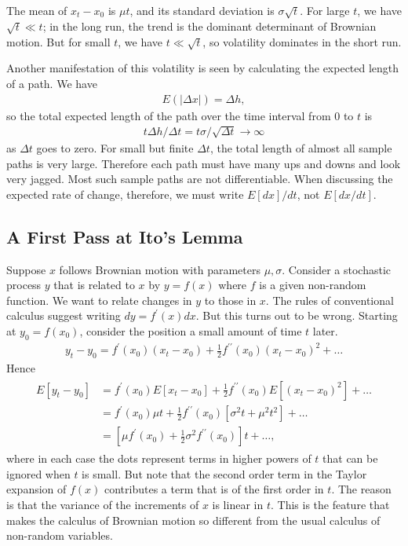 \documentclass[\topdir/lecture\_notes.tex]{subfiles}
\begin{document}
The mean of $x_{t}-x_{0}$ is $\mu t$, and its standard deviation is $\sigma \sqrt{t}$. For large $t$, we have $\sqrt{t} \ll t$; in the long run, the trend is the dominant determinant of Brownian motion. But for small $t$, we have $t \ll \sqrt{t}$, so volatility dominates in the short run.

Another manifestation of this volatility is seen by calculating the expected length of a path. We have
\begin{align*}
E(|\Delta x|)=\Delta h,
\end{align*}
so the total expected length of the path over the time interval from 0 to $t$ is
\begin{align*}
t \Delta h / \Delta t=t \sigma / \sqrt{\Delta t} \rightarrow \infty
\end{align*}
as $\Delta t$ goes to zero. For small but finite $\Delta t$, the total length of almost all sample paths is very large. Therefore each path must have many ups and downs and look very jagged. Most such sample paths are not differentiable. When discussing the expected rate of change, therefore, we must write $E[dx] / dt$, not $E[dx / dt]$.

\subsection{A First Pass at Ito's Lemma}
Suppose $x$ follows Brownian motion with parameters $\mu, \sigma$. Consider a stochastic process $y$ that is related to $x$ by $y=f(x)$ where $f$ is a given non-random function. We want to relate changes in $y$ to those in $x$. The rules of conventional calculus suggest writing $d y=f^{\prime}(x) dx$. But this turns out to be wrong. Starting at $y_{0}=f\left(x_{0}\right)$, consider the position a small amount of time $t$ later.
\begin{align*}
y_{t}-y_{0}=f^{\prime}\left(x_{0}\right)\left(x_{t}-x_{0}\right)+\frac{1}{2} f^{\prime \prime}\left(x_{0}\right)\left(x_{t}-x_{0}\right)^{2}+\ldots
\end{align*}
Hence
\begin{align*}
\begin{aligned}
E\left[y_{t}-y_{0}\right] & =f^{\prime}\left(x_{0}\right) E\left[x_{t}-x_{0}\right]+\frac{1}{2} f^{\prime \prime}\left(x_{0}\right) E\left[\left(x_{t}-x_{0}\right)^{2}\right]+\ldots \\
& =f^{\prime}\left(x_{0}\right) \mu t+\frac{1}{2} f^{\prime \prime}\left(x_{0}\right)\left[\sigma^{2} t+\mu^{2} t^{2}\right]+\ldots \\
& =\left[\mu f^{\prime}\left(x_{0}\right)+\frac{1}{2} \sigma^{2} f^{\prime \prime}\left(x_{0}\right)\right] t+\ldots,
\end{aligned}
\end{align*}
where in each case the dots represent terms in higher powers of $t$ that can be ignored when $t$ is small. But note that the second order term in the Taylor expansion of $f(x)$ contributes a term that is of the first order in $t$. The reason is that the variance of the increments of $x$ is linear in $t$. This is the feature that makes the calculus of Brownian motion so different from the usual calculus of non-random variables.
\end{document}

